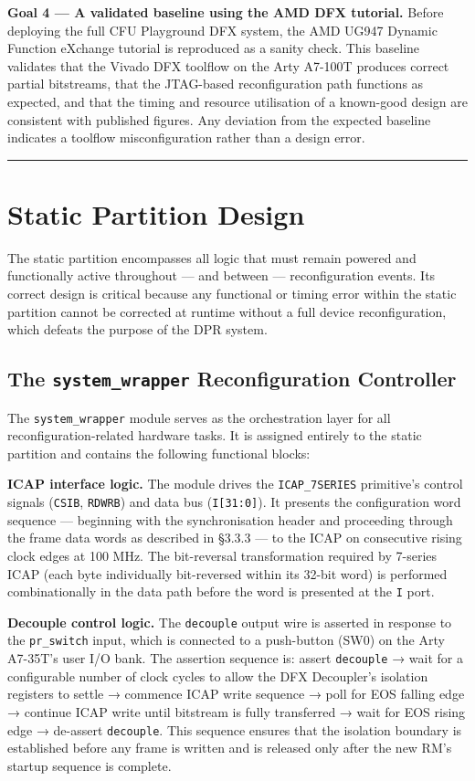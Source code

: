 \textbf{Goal 4 — A validated baseline using the AMD DFX tutorial.} Before deploying the full CFU Playground DFX system, the AMD UG947 Dynamic Function eXchange tutorial is reproduced as a sanity check. This baseline validates that the Vivado DFX toolflow on the Arty A7-100T produces correct partial bitstreams, that the JTAG-based reconfiguration path functions as expected, and that the timing and resource utilisation of a known-good design are consistent with published figures. Any deviation from the expected baseline indicates a toolflow misconfiguration rather than a design error.

\vspace{0.4em}\hrule\vspace{0.4em}

\section{Static Partition Design}

The static partition encompasses all logic that must remain powered and functionally active throughout — and between — reconfiguration events. Its correct design is critical because any functional or timing error within the static partition cannot be corrected at runtime without a full device reconfiguration, which defeats the purpose of the DPR system.

\subsection{The \texttt{system\_wrapper} Reconfiguration Controller}

The \texttt{system\_wrapper} module serves as the orchestration layer for all reconfiguration-related hardware tasks. It is assigned entirely to the static partition and contains the following functional blocks:

\textbf{ICAP interface logic.} The module drives the \texttt{ICAP\_7SERIES} primitive's control signals (\texttt{CSIB}, \texttt{RDWRB}) and data bus (\texttt{I[31:0]}). It presents the configuration word sequence — beginning with the synchronisation header and proceeding through the frame data words as described in §3.3.3 — to the ICAP on consecutive rising clock edges at 100 MHz. The bit-reversal transformation required by 7-series ICAP (each byte individually bit-reversed within its 32-bit word) is performed combinationally in the data path before the word is presented at the \texttt{I} port.

\textbf{Decouple control logic.} The \texttt{decouple} output wire is asserted in response to the \texttt{pr\_switch} input, which is connected to a push-button (SW0) on the Arty A7-35T's user I/O bank. The assertion sequence is: assert \texttt{decouple} → wait for a configurable number of clock cycles to allow the DFX Decoupler's isolation registers to settle → commence ICAP write sequence → poll for EOS falling edge → continue ICAP write until bitstream is fully transferred → wait for EOS rising edge → de-assert \texttt{decouple}. This sequence ensures that the isolation boundary is established before any frame is written and is released only after the new RM's startup sequence is complete.


